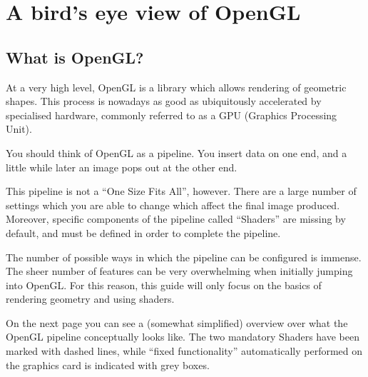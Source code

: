 \chapter{A bird's eye view of OpenGL}

\section{What is OpenGL?}

At a very high level, OpenGL is a library which allows rendering of geometric shapes. This process is nowadays as good as ubiquitously accelerated by specialised hardware, commonly referred to as a GPU (Graphics Processing Unit).

You should think of OpenGL as a pipeline. You insert data on one end, and a little while later an image pops out at the other end. 

This pipeline is not a ``One Size Fits All'', however. There are a large number of settings which you are able to change which affect the final image produced. Moreover, specific components of the pipeline called ``Shaders'' are missing by default, and must be defined in order to complete the pipeline.

The number of possible ways in which the pipeline can be configured is immense. The sheer number of features can be very overwhelming when initially jumping into OpenGL. For this reason, this guide will only focus on the basics of rendering geometry and using shaders.

On the next page you can see a (somewhat simplified) overview over what the OpenGL pipeline conceptually looks like. The two mandatory Shaders have been marked with dashed lines, while ``fixed functionality'' automatically performed on the graphics card is indicated with grey boxes.

